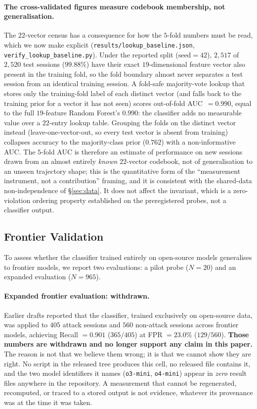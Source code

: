 \documentclass{article}
\begin{document}
\paragraph{The cross-validated figures measure codebook membership, not generalisation.}
The $22$-vector census has a consequence for how the $5$-fold numbers must be read, which we
now make explicit (\texttt{results/lookup\_baseline.json}, \texttt{verify\_lookup\_baseline.py}).
Under the reported split ($\mathrm{seed}=42$), $2{,}517$ of $2{,}520$ test sessions ($99.88\%$)
have their exact $19$-dimensional feature vector also present in the training fold, so the
fold boundary almost never separates a test session from an identical training session. A
fold-safe majority-vote lookup that stores only the training-fold label of each distinct
vector (and falls back to the training prior for a vector it has not seen) scores
out-of-fold AUC~$=0.990$, equal to the full $19$-feature Random Forest's $0.990$: the
classifier adds no measurable value over a $22$-entry lookup table. Grouping the folds on the
distinct vector instead (leave-one-vector-out, so every test vector is absent from training)
collapses accuracy to the majority-class prior ($0.762$) with a non-informative AUC. The
$5$-fold AUC is therefore an estimate of performance on new sessions drawn from an almost
entirely \emph{known} $22$-vector codebook, not of generalisation to an unseen trajectory
shape; this is the quantitative form of the ``measurement instrument, not a contribution''
framing, and it is consistent with the shared-data non-independence of \S\ref{sec:data}. It
does not affect the invariant, which is a zero-violation ordering property established on the
preregistered probes, not a classifier output.

\subsection{Frontier Validation}
\label{sec:gpt41}

To assess whether the classifier trained entirely on open-source models generalises to frontier models, we report two evaluations: a pilot probe ($N{=}20$) and an expanded evaluation ($N{=}965$).

\paragraph{Expanded frontier evaluation: withdrawn.} Earlier drafts
reported that the classifier, trained exclusively on open-source data, was applied to $405$
attack sessions and $560$ non-attack sessions across frontier models, achieving
Recall $= 0.901$ ($365/405$) at FPR $= 23.0\%$ ($129/560$). \textbf{Those numbers are
withdrawn and no longer support any claim in this paper.} The reason is not that we believe
them wrong; it is that we cannot show they are right. No script in the released tree produces
this cell, no released file contains it, and the two model identifiers it names
(\texttt{o3-mini}, \texttt{o4-mini}) appear in \emph{zero} result files anywhere in the
repository. A measurement that cannot be regenerated, recomputed, or traced to a stored
output is not evidence, whatever its provenance was at the time it was taken.
\end{document}
